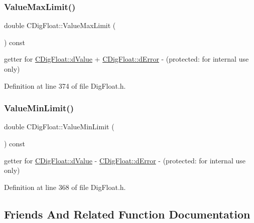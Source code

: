 \mbox{\label{classCDigFloat_a20195234feac0aaa9acbb5ad0fcfeabb}} 
\subsubsection{\texorpdfstring{Value\+Max\+Limit()}{ValueMaxLimit()}}
{\footnotesize\ttfamily double C\+Dig\+Float\+::\+Value\+Max\+Limit (\begin{DoxyParamCaption}{ }\end{DoxyParamCaption}) const\hspace{0.3cm}{\ttfamily [inline]}}



getter for \hyperlink{classCDigFloat_a4bbe69e30dd4e20527362493aa9aaf96}{C\+Dig\+Float\+::d\+Value} + \hyperlink{classCDigFloat_a25eb3782d1e727ff007a48f8308e3d4d}{C\+Dig\+Float\+::d\+Error} -\/ (protected\+: for internal use only) 



Definition at line 374 of file Dig\+Float.\+h.

\mbox{\label{classCDigFloat_a89603e1f9b9061b65376ac7b5fffddcf}} 
\subsubsection{\texorpdfstring{Value\+Min\+Limit()}{ValueMinLimit()}}
{\footnotesize\ttfamily double C\+Dig\+Float\+::\+Value\+Min\+Limit (\begin{DoxyParamCaption}{ }\end{DoxyParamCaption}) const\hspace{0.3cm}{\ttfamily [inline]}}



getter for \hyperlink{classCDigFloat_a4bbe69e30dd4e20527362493aa9aaf96}{C\+Dig\+Float\+::d\+Value} -\/ \hyperlink{classCDigFloat_a25eb3782d1e727ff007a48f8308e3d4d}{C\+Dig\+Float\+::d\+Error} -\/ (protected\+: for internal use only) 



Definition at line 368 of file Dig\+Float.\+h.



\subsection{Friends And Related Function Documentation}
\mbox{\label{classCDigFloat_a269b310d675c311c6e0894bf326593ae}} 

